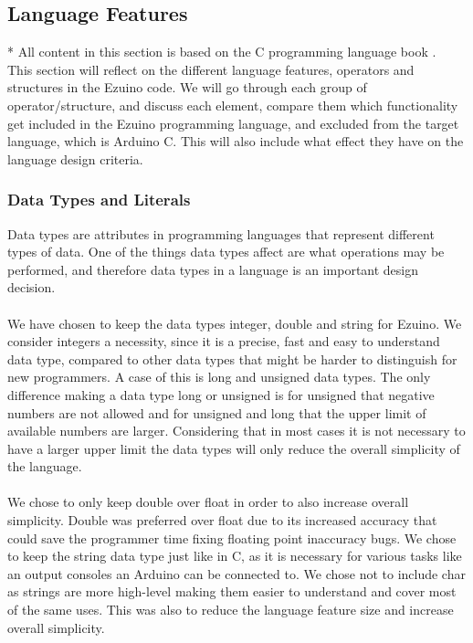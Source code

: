 \subsection{Language Features}
\label{language-features}
* All content in this section is based on the C programming language book \cite{kernighan1988c}.\\
This section will reflect on the different language features, operators and structures in the Ezuino code. We will go through each group of operator/structure, and discuss each element, compare them which functionality get included in the Ezuino programming language, and excluded from the target language, which is Arduino C. This will also include what effect they have on the language design criteria.\\
\subsubsection*{Data Types and Literals}
Data types are attributes in programming languages that represent different types of data. One of the things data types affect are what operations may be performed, and therefore data types in a language is an important design decision.
\\ \\
We have chosen to keep the data types integer, double and string for Ezuino. We consider integers a necessity, since it is a precise, fast and easy to understand data type, compared to other data types that might be harder to distinguish for new programmers. A case of this is long and unsigned data types. The only difference making a data type long or unsigned is for unsigned that negative numbers are not allowed and for unsigned and long that the upper limit of available numbers are larger. Considering that in most cases it is not necessary to have a larger upper limit the data types will only reduce the overall simplicity of the language.
\\ \\
We chose to only keep double over float in order to also increase overall simplicity. Double was preferred over float due to its increased accuracy that could save the programmer time fixing floating point inaccuracy bugs. We chose to keep the string data type just like in C, as it is necessary for various tasks like an output consoles an Arduino can be connected to. We chose not to include char as strings are more high-level making them easier to understand and cover most of the same uses. This was also to reduce the language feature size and increase overall simplicity.
